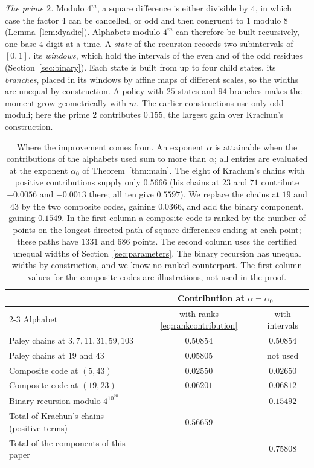 \documentclass[11pt]{article}
\theoremstyle{definition}
\theoremstyle{remark}
\newcommand{\al}{\alpha_0}
\begin{document}
\emph{The prime $2$.} Modulo $4^m$, a square difference is either divisible by
$4$, in which case the factor $4$ can be cancelled, or odd and then congruent
to $1$ modulo $8$ (Lemma~\ref{lem:dyadic}). Alphabets modulo $4^m$ can
therefore be built recursively, one base-$4$ digit at a time. A \emph{state}
of the recursion records two subintervals of $[0,1]$, its \emph{windows},
which hold the intervals of the even and of the odd residues
(Section~\ref{sec:binary}). Each state is built from up to four child states,
its \emph{branches}, placed in its windows by affine maps of different
scales, so the widths are unequal by construction. A policy with $25$ states
and $94$ branches makes the moment grow geometrically with $m$. The earlier
constructions use only odd moduli; here the prime $2$ contributes $0.155$, the
largest gain over Krachun's construction.

\begin{table}[!ht]
\centering\small
\begin{tabular}{lcc}\toprule
& \multicolumn{2}{c}{Contribution at $\alpha=\al$}\\\cmidrule(l){2-3}
Alphabet & with ranks \eqref{eq:rankcontribution} & with intervals\\\midrule
Paley chains at $3,7,11,31,59,103$ & $0.50854$ & $0.50854$\\
Paley chains at $19$ and $43$ & $0.05805$ & not used\\
Composite code at $(5,43)$ & $0.02550$ & $0.02650$\\
Composite code at $(19,23)$ & $0.06201$ & $0.06812$\\
Binary recursion modulo $4^{10^{20}}$ & --- & $0.15492$\\\midrule
Total of Krachun's chains (positive terms) & $0.56659$ & \\
Total of the components of this paper & & $0.75808$\\\bottomrule
\end{tabular}
\caption{Where the improvement comes from. An exponent $\alpha$ is attainable
when the contributions of the alphabets used sum to more than $\alpha$; all
entries are evaluated at the exponent $\al$ of Theorem~\ref{thm:main}.
The eight of Krachun's chains with positive contributions supply only $0.5666$
(his chains at $23$ and $71$ contribute $-0.0056$ and $-0.0013$ there; all ten
give $0.5597$). We replace the chains at $19$ and $43$ by the two composite
codes, gaining $0.0366$, and add the binary component, gaining $0.1549$. In the
first column a composite code is ranked by the number of points on the longest
directed path of square differences ending at each point; these paths have
$1331$ and $686$ points. The second column uses the certified unequal widths of
Section~\ref{sec:parameters}. The binary recursion has unequal widths by
construction, and we know no ranked counterpart. The first-column values for
the composite codes are illustrations, not used in the proof.}\label{tab:budget}
\end{table}
\end{document}
